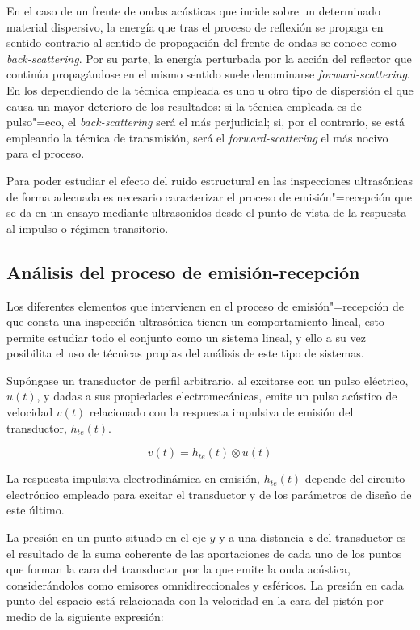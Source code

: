 En el caso de un frente de ondas acústicas que incide sobre un determinado
material dispersivo, la energía que tras el proceso de reflexión se propaga
en sentido contrario al sentido de propagación del frente de ondas se
conoce como \emph{back-scattering}. Por su parte, la energía perturbada por
la acción del reflector que continúa propagándose en el mismo sentido suele
denominarse \emph{forward-scattering}. En los  dependiendo de la
técnica empleada es uno u otro tipo de dispersión el que causa un mayor
deterioro de los resultados: si la técnica empleada es de pulso"=eco, el
\emph{back-scattering} será el más perjudicial; si, por el contrario, se
está empleando la técnica de transmisión, será el \emph{forward-scattering}
el más nocivo para el proceso.

Para poder estudiar el efecto del ruido estructural en las inspecciones
ultrasónicas de forma adecuada es necesario caracterizar el proceso de
emisión"=recepción que se da en un ensayo mediante ultrasonidos desde el
punto de vista de la respuesta al impulso o régimen transitorio.


\subsection{Análisis del proceso de emisión-recepción}

Los diferentes elementos que intervienen en el proceso de
emisión"=recepción de que consta una inspección ultrasónica tienen un
comportamiento lineal, esto permite estudiar todo el conjunto como un
sistema lineal, y ello a su vez posibilita el uso de técnicas propias del
análisis de este tipo de sistemas.

Supóngase un transductor de perfil arbitrario, al excitarse con un pulso
eléctrico, $u(t)$, y dadas a sus propiedades electromecánicas, emite un
pulso acústico de velocidad $v(t)$ relacionado con la respuesta impulsiva
de emisión del transductor, $h_{te}(t)$.

\begin{equation}
	v(t) = h_{te}(t)\otimes u(t)
	\label{eq:emiter}
\end{equation}

La respuesta impulsiva electrodinámica en emisión, $h_{te}(t)$ depende del
circuito electrónico empleado para excitar el transductor y de los
parámetros de diseño de este último.

La presión en un punto situado en el eje $y$ y a una distancia $z$ del
transductor es el resultado de la suma coherente de las aportaciones de
cada uno de los puntos que forman la cara del transductor por la que emite
la onda acústica, considerándolos como emisores omnidireccionales y
esféricos. La presión en cada punto del espacio está relacionada con la
velocidad en la cara del pistón por medio de la siguiente expresión:

